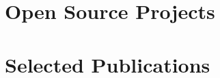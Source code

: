 \documentclass[a4paper,11pt]{article}
\begin{document}
    \section{Open Source Projects}
        \begin{itemize}
            \fossHPZ
                \cvItemizeBegin
                    \fossHPZA
                    \fossHPZB
                    \fossHPZC
                \cvItemizeEnd
            \fossConvSnn
                \cvItemizeBegin
                    \fossConvSnnA
                    \fossConvSnnB
                \cvItemizeEnd
            \fossRazerDataScience
                \cvItemizeBegin
                    \fossRazerDataScienceA
                \cvItemizeEnd
        \end{itemize}

    \section{Selected Publications}
        \publicationItemizeBegin
            \publicationInCIT
            \publicationAAAI
            \publicationSpikingTransformer
            \publicationRateCoded
            \publicationEncodingSurvey
            \seeGoogleScholar
        \publicationItemizeEnd
\end{document}

